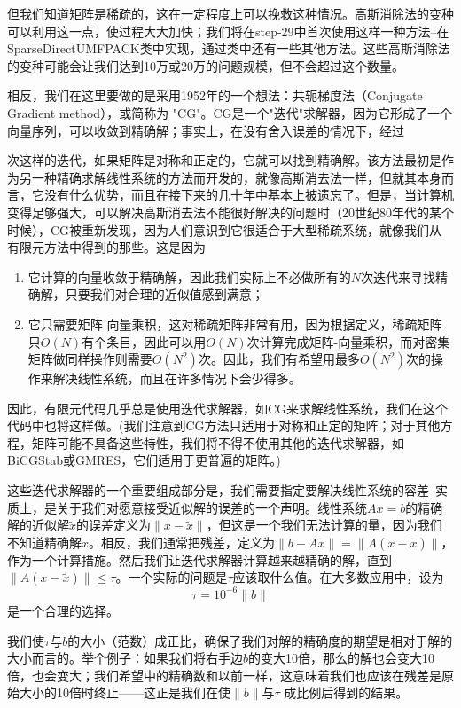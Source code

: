 \documentclass[nofonts]{ctexart} %
\begin{document}
但我们知道矩阵是稀疏的，这在一定程度上可以挽救这种情况。高斯消除法的变种可以利用这一点，使过程大大加快；我们将在step-29中首次使用这样一种方法--在SparseDirectUMFPACK类中实现，通过类中还有一些其他方法。这些高斯消除法的变种可能会让我们达到10万或20万的问题规模，但不会超过这个数量。

相反，我们在这里要做的是采用1952年的一个想法：共轭梯度法（Conjugate Gradient method），或简称为 "CG"。CG是一个"迭代"求解器，因为它形成了一个向量序列，可以收敛到精确解；事实上，在没有舍入误差的情况下，经过

次这样的迭代，如果矩阵是对称和正定的，它就可以找到精确解。该方法最初是作为另一种精确求解线性系统的方法而开发的，就像高斯消去法一样，但就其本身而言，它没有什么优势，而且在接下来的几十年中基本上被遗忘了。但是，当计算机变得足够强大，可以解决高斯消去法不能很好解决的问题时（20世纪80年代的某个时候），CG被重新发现，因为人们意识到它很适合于大型稀疏系统，就像我们从有限元方法中得到的那些。这是因为
\begin{enumerate}
    \item 它计算的向量收敛于精确解，因此我们实际上不必做所有的$N$次迭代来寻找精确解，只要我们对合理的近似值感到满意；
    \item 它只需要矩阵-向量乘积，这对稀疏矩阵非常有用，因为根据定义，稀疏矩阵只$O(N)$有个条目，因此可以用$O(N)$次计算完成矩阵-向量乘积，而对密集矩阵做同样操作则需要$O(N^2)$次。因此，我们有希望用最多$O(N^2)$次的操作来解决线性系统，而且在许多情况下会少得多。
\end{enumerate}


因此，有限元代码几乎总是使用迭代求解器，如CG来求解线性系统，我们在这个代码中也将这样做。(我们注意到CG方法只适用于对称和正定的矩阵；对于其他方程，矩阵可能不具备这些特性，我们将不得不使用其他的迭代求解器，如BiCGStab或GMRES，它们适用于更普遍的矩阵。)

这些迭代求解器的一个重要组成部分是，我们需要指定要解决线性系统的容差--实质上，是关于我们对愿意接受近似解的误差的一个声明。线性系统$Ax=b$的精确解的近似解$\tilde{x}$的误差定义为$\|x-\tilde{x}\|$，但这是一个我们无法计算的量，因为我们不知道精确解$x$。相反，我们通常把残差，定义为$\|b-A\tilde{x}\|=\|A(x-\tilde{x})\|$，作为一个计算措施。然后我们让迭代求解器计算越来越精确的解，直到$\|A(x-\tilde{x})\|\leq\tau $。一个实际的问题是$\tau$应该取什么值。在大多数应用中，设为
\begin{equation}
    \tau=10^{-6}\|b\|
\end{equation}
是一个合理的选择。

    我们使$\tau$与$b$的大小（范数）成正比，确保了我们对解的精确度的期望是相对于解的大小而言的。举个例子：如果我们将右手边$b$的变大10倍，那么的解也会变大10倍，也会变大；我们希望中的精确数和以前一样，这意味着我们也应该在残差是原始大小的10倍时终止——这正是我们在使$\|b\|$与$\tau$
    成比例后得到的结果。
\end{document}
